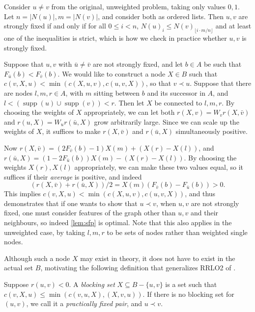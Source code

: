 \documentclass[a4paper,UKenglish,cleveref, autoref, thm-restate]{lipics-v2021}
\renewcommand{\b}{\prec}
\DeclareMathOperator{\supp}{supp}
\begin{document}
\begin{remark}
    Consider $u \neq v$ from the original, unweighted problem, taking only values $0, 1$. Let 
    $n = |N(u)|, m = |N(v)|$, and consider both as ordered lists. Then $u, v$ are strongly
    fixed if and only if for all $0 \leq i < n$, $N(u)_i \leq N(v)_{\lfloor i\cdot m/n
    \rfloor}$ and at least one of the inequalities is strict, which is how we check in practice
    whether $u, v$ is strongly fixed.
\end{remark}

\begin{remark}\label{rem:strongest}
    Suppose that $u, v$ with $\bar u \neq \bar v$ are not strongly fixed, and let $b \in A$ be
    such that $F_{\bar u}(b) < F_{\bar v}(b)$.
    We would like to construct a node $X\in B$ such that $c(v, X, u) < \min(c(X,
    u, v), c(u, v, X))$, so that $v\b u$.
    Suppose that there are nodes $l, m,
    r \in A$, with $m$ sitting between $b$ and its successor in $A$, and $l < (\supp(u) \cup
    \supp(v)) < r$. Then let $X$ be connected to $l, m, r$. By choosing
    the weights of $X$ appropriately, we can let both $r(X, v) = W_v r(X, \bar v)$ and $r(u, X)
    = W_u r(\bar u, X)$ grow arbitrarily large. Since we can scale up the weights of $X$, it
    suffices to make $r(X, \bar v)$ and $r(\bar u, X)$ simultaneously positive.

    Now $r(X, \bar v) = (2F_{\bar v}(b) - 1)X(m) + (X(r) - X(l))$, and $r(\bar u, X) = (1 -
    2F_{\bar u}(b))X(m) - (X(r) - X(l))$. By choosing the weights $X(r), X(l)$ appropriately, we can make
    these two values equal, so it suffices if their \emph{average} is positive, and indeed
    $${(r(X, \bar v) + r(\bar u, X))/2 = X(m)(F_{\bar v}(b) - F_{\bar u}(b)) > 0}.$$
    This implies $c(v, X, u) < \min(c(X, u, v), c(u, v, X))$, and thus
    demonstrates that if one wants to show that $u \b v$, when $u,
    v$ are not strongly fixed, one must consider features of the graph other than $u, v$ and
    their neighbours, so indeed \cref{lem:sfp} is optimal. Note that this also applies in the unweighted case,
    by taking $l, m, r$ to be sets of nodes rather than weighted single nodes.
\end{remark}

Although such a node $X$ may exist in theory, it does
not have to exist in the actual set $B$, motivating the following definition
that generalizes RRLO2 of \cite{dujmovic_2008}.

\begin{lemma}\label{pfp}
  Suppose $r(u,v)< 0$.
    A \emph{blocking set} $X\subseteq B-\{u,v\}$ is a set such that $c(v,X,u) \leq \min(c(v, u,
    X), (X, v, u))$.  If there is no blocking set for $(u, v)$, we call it a
    \emph{practically fixed pair}, and $u\b v$.
\end{lemma}
\end{document}
